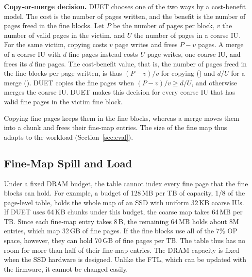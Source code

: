 \textbf{Copy-or-merge decision.} DUET chooses one of the two ways by a cost-benefit model. The cost is the
number of pages written, and the benefit is the number of pages freed in the
fine blocks. Let $P$ be the number of pages per block, $v$ the number of valid
pages in the victim, and $U$ the number of pages in a coarse IU. For the same
victim, copying costs $v$ page writes and frees $P - v$ pages. A merge of a
coarse IU with $d$ fine pages instead costs $U$ page writes, one coarse IU, and
frees its $d$ fine pages. The cost-benefit value, that is, the number of pages
freed in the fine blocks per page written, is thus $(P-v)/v$ for copying
() and $d/U$ for a merge (). DUET copies the fine pages when
$(P-v)/v \ge d/U$, and otherwise merges the coarse IU. DUET makes this decision for
every coarse IU that has valid fine pages in the victim fine block.

Copying fine pages keeps them in the fine blocks, whereas a merge moves them
into a chunk and frees their fine-map entries. The size of the fine map thus
adapts to the workload (Section~\ref{sec:eval}).

\subsection{Fine-Map Spill and Load}
\label{sec:spill}
Under a fixed DRAM budget, the table cannot index every fine page that the fine
blocks can hold. For example, a budget of 128\,MB per TB of capacity, 1/8 of
the page-level table, holds the whole map of an SSD with uniform 32\,KB coarse IUs. If
DUET uses 64\,KB chunks under this budget, the coarse map takes 64\,MB per TB.
Since each fine-map entry takes 8\,B, the remaining 64\,MB holds about 8M
entries, which map 32\,GB of fine pages. If the fine blocks use all of
the 7\% OP space, however, they can hold 70\,GB of fine pages per TB. The table thus has no room for more
than half of their fine-map entries. The DRAM capacity is fixed when the SSD hardware is designed.
Unlike the FTL, which can be updated with the firmware, it cannot be changed easily.

